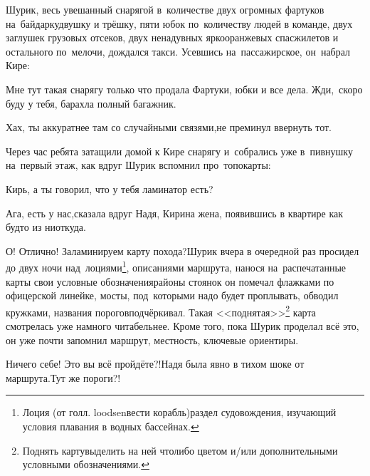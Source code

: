 
\vspace{0.5cm}
\myldots{}Шурик, весь увешанный снарягой в~количестве двух огромных фартуков на~байдарку\sdash двушку и трёшку, пяти юбок по~количеству людей в команде, двух заглушек грузовых отсеков, двух ненадувных ярко\sdash оранжевых спасжилетов и остального по~мелочи, дождался такси. Усевшись на~пассажирское, он~набрал Кире:

\diagdash Мне тут такая снарягу только что продала\myldots{} Фартуки, юбки и все дела. Жди,~скоро буду у тебя, барахла полный багажник.

\diagdash Хах, ты аккуратнее там со случайными связями,\mdash не преминул ввернуть тот. %

Через час ребята затащили домой к Кире снарягу и~собрались уже в~пивнушку на~первый этаж, как вдруг Шурик вспомнил про~топокарты:

\diagdash Кирь, а ты говорил, что у тебя ламинатор есть?

\diagdash Ага, есть у нас,\mdash сказала вдруг Надя, Кирина жена, появившись в квартире как будто из ниоткуда.

\setcounter{footnote}{0}
\renewcommand*{\thefootnote}{\arabic{footnote}}

\diagdash О! Отлично! Заламинируем карту похода?\mdash Шурик вчера в очередной раз просидел до двух ночи над~лоциями\footnote{Лоция (от голл. loodsen\mdash вести корабль)\mdash раздел судовождения, изучающий условия плавания в водных бассейнах.}, описаниями маршрута, нанося на~распечатанные карты свои условные обозначения\mdash районы стоянок он помечал флажками по офицерской линейке, мосты, под~которыми надо будет проплывать, обводил кружками, названия порогов\mdash подчёркивал. Такая <<поднятая>>\footnote{Поднять карту\mdash выделить на ней что\sdash либо цветом и/или дополнительными условными обозначениями.} карта смотрелась уже намного читабельнее. Кроме того, пока Шурик проделал всё это, он уже почти запомнил маршрут, местность, ключевые ориентиры.

\diagdash Ничего себе! Это вы всё пройдёте?!\mdash Надя была явно в тихом шоке от маршрута.\mdash Тут же пороги?!

